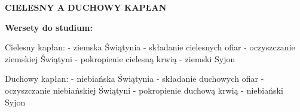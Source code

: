 \documentclass[10pt,a4paper,oneside]{article}
\begin{document}
\centerline{\textbf{\MakeUppercase{Cielesny a duchowy kapłan}}}
\begin{center}
\textbf{Wersety do studium:} 
\end{center}
Cielesny kapłan:
- ziemska Świątynia
- składanie cielesnych ofiar
- oczyszczanie ziemskiej Świątyni
- pokropienie cielesną krwią
- ziemski Syjon

Duchowy kapłan:
- niebiańska Świątynia
- składanie duchowych ofiar
- oczyszczanie niebiańskiej Świątyni
- pokropienie duchową krwią
- niebiański Syjon
\end{document}
